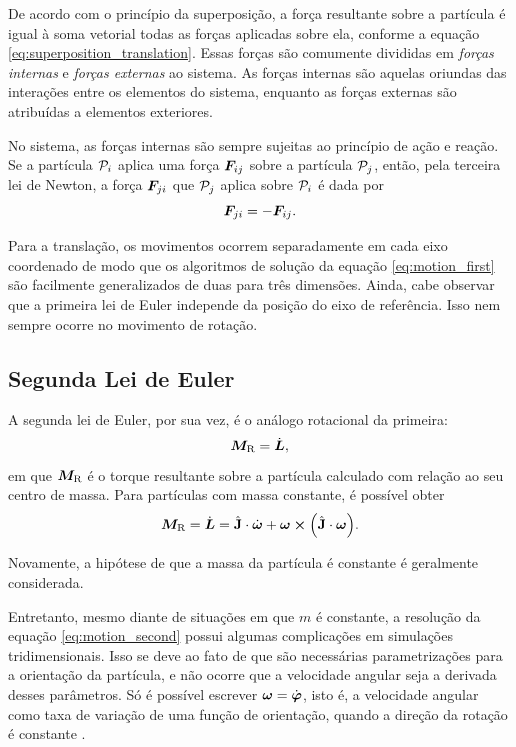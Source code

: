 De acordo com o princípio da superposição, a força resultante sobre a partícula é igual à soma vetorial todas as forças aplicadas sobre ela, conforme a equação \eqref{eq:superposition_translation}. Essas forças são comumente divididas em \textit{forças internas} e \textit{forças externas} ao sistema. As forças internas são aquelas oriundas das interações entre os elementos do sistema, enquanto as forças externas são atribuídas a elementos exteriores. 

No sistema, as forças internas são sempre sujeitas ao princípio de ação e reação. Se a partícula \({\mathcal{P}}_{i}\) aplica uma força \({\bm{F}}_{i j}\) sobre a partícula \({\mathcal{P}}_{j}\), então, pela terceira lei de Newton,  a força \({\bm{F}}_{j i}\) que \({\mathcal{P}}_{j}\) aplica sobre \({\mathcal{P}}_{i}\) é dada por
\begin{equation*}
	{\bm{F}}_{j i} = - {\bm{F}}_{i j}.
\end{equation*}

Para a translação, os movimentos ocorrem separadamente em cada eixo coordenado de modo que os algoritmos de solução da equação \eqref{eq:motion_first} são facilmente generalizados de duas para três dimensões. Ainda, cabe observar que a primeira lei de Euler independe da posição do eixo de referência. Isso nem sempre ocorre no movimento de rotação.

\subsection{Segunda Lei de Euler}

A segunda lei de Euler, por sua vez, é o análogo rotacional da primeira:
\begin{equation*} %
	\resultingTorque = \deriv{1}{\angularMomentum},
\end{equation*}
em que \(\bm{M}_{\text{R}}\) é o torque resultante sobre a partícula calculado com relação ao seu centro de massa. Para partículas com massa constante, é possível obter
\begin{equation} \label{eq:motion_second}
	\resultingTorque = \deriv{1}{\angularMomentum} = \tensorOfInertia\cdot\deriv{1}{\angularVelocity} + \angularVelocity\cross\pqty{\tensorOfInertia\cdot\angularVelocity}.
\end{equation}

Novamente, a hipótese de que a massa da partícula é constante é geralmente considerada. 

Entretanto, mesmo diante de situações em que \(m\) é constante, a resolução da equação \eqref{eq:motion_second} possui algumas complicações em simulações tridimensionais. Isso se deve ao fato de que são necessárias parametrizações para a orientação da partícula, e não ocorre que a velocidade angular seja a derivada desses parâmetros. Só é possível escrever \(\angularVelocity = \deriv{1}{\orientation}\), isto é, a velocidade angular como taxa de variação de uma função de orientação, quando a direção da rotação é constante \cite[p. 32]{bib:dynamics_of_multibody_systems}.

